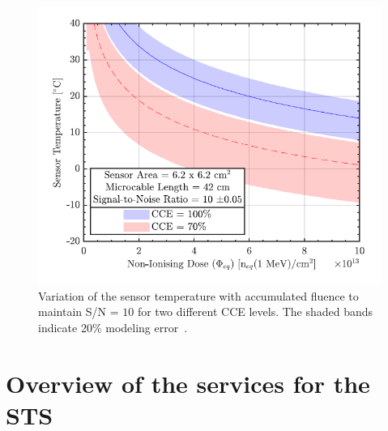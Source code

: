 \begin{figure}[!h]
\centering
\includegraphics[width=0.7\columnwidth]{Chapter2/images/SN.png}
\caption{Variation of the sensor temperature with accumulated fluence to maintain S/N = $10$ for two different CCE levels. The shaded bands indicate 20\% modeling error~\cite{Agarwal}.}
\label{fig_cce_temp}
\end{figure}



\section{Overview of the services for the STS}

